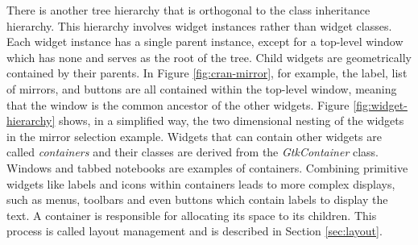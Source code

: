 \documentclass[article]{jss}
\begin{document}
There is another tree hierarchy that is orthogonal to the 
class inheritance hierarchy. This hierarchy involves widget instances
rather
than widget classes. Each widget instance has a single parent
instance, except
for a top-level window which has none and serves as the root of the
tree. Child widgets are geometrically
contained by their parents. In Figure \ref{fig:cran-mirror}, 
for example, the label, list of mirrors, and buttons are all contained
within the 
top-level window, meaning that the window is the common ancestor of
the other widgets.
Figure \ref{fig:widget-hierarchy} shows, in a simplified way, the two
dimensional
nesting of the widgets in the mirror selection example. Widgets that
can contain 
other widgets are called \emph{containers} and their classes are
derived from 
the \emph{GtkContainer} class. Windows and tabbed notebooks are
examples of containers.
Combining primitive widgets like labels and icons within containers
leads to more complex displays, such as menus, toolbars and even
buttons which contain labels to display the text. A container is 
responsible for allocating its space to its children. This process is
called
layout management and is described in Section \ref{sec:layout}.
\end{document}
